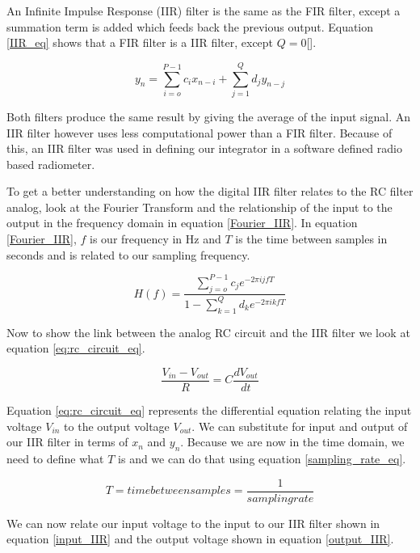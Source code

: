 An Infinite Impulse Response (IIR) filter is the same as the FIR filter, except a summation term is added which feeds back the previous output.  Equation \ref{IIR_eq} shows that a FIR filter is a IIR filter, except $Q=0$[\cite{Cross}]. 

\begin{equation}\label{IIR_eq}
y_n=\displaystyle\sum\limits_{i=o}^{P-1} c_ix_{n-i}+\displaystyle\sum\limits_{j=1}^{Q} d_jy_{n-j}
\end{equation}

Both filters produce the same result by giving the average of the input signal.  An IIR filter however uses less computational power than a FIR filter.  Because of this, an IIR filter was used in defining our integrator in a software defined radio based radiometer.

To get a better understanding on how the digital IIR filter relates to the RC filter analog, look at the Fourier Transform and the relationship of the input to the output in the frequency domain in equation \ref{Fourier_IIR}.  In equation \ref{Fourier_IIR}, $f$ is our frequency in Hz and $T$ is the time between samples in seconds and is related to our sampling frequency.

\begin{equation}\label{Fourier_IIR}
H(f)=\frac{\displaystyle\sum\limits_{j=o}^{P-1} c_je^{-2\pi ijfT}}{1-\displaystyle\sum\limits_{k=1}^{Q} d_ke^{-2\pi ikfT}}
\end{equation}

Now to show the link between the analog RC circuit and the IIR filter we look at equation \ref{eq:rc_circuit_eq}.  

\begin{equation}\label{eq:rc_circuit_eq}
\frac{V_{in}-V_{out}}{R}=C\frac{dV_{out}}{dt}
\end{equation}

Equation \ref{eq:rc_circuit_eq} represents the differential equation relating the input voltage $V_{in}$ to the output voltage $V_{out}$.  We can substitute for input and output of our IIR filter in terms of $x_n$ and $y_n$.  Because we are now in the time domain, we need to define what $T$ is and we can do that using equation \ref{sampling_rate_eq}.

\begin{equation}\label{sampling_rate_eq}
T=time between samples=\frac{1}{sampling rate}
\end{equation}

We can now relate our input voltage to the input to our IIR filter shown in equation \ref{input_IIR} and the output voltage shown in equation \ref{output_IIR}.

